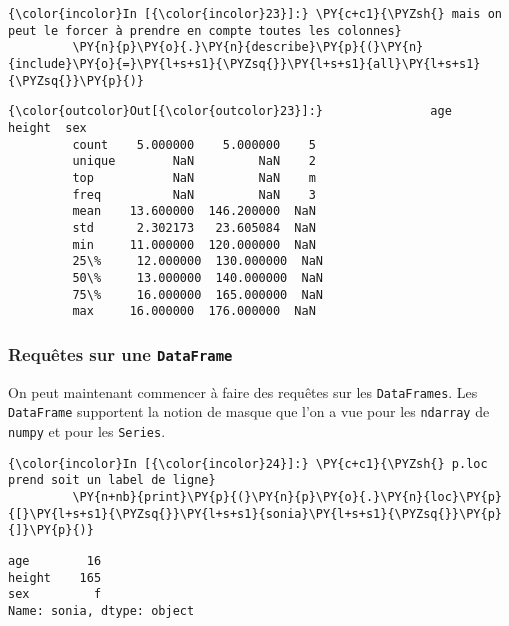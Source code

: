     \begin{Verbatim}[commandchars=\\\{\},frame=single,framerule=0.3mm,rulecolor=\color{cellframecolor}]
{\color{incolor}In [{\color{incolor}23}]:} \PY{c+c1}{\PYZsh{} mais on peut le forcer à prendre en compte toutes les colonnes}
         \PY{n}{p}\PY{o}{.}\PY{n}{describe}\PY{p}{(}\PY{n}{include}\PY{o}{=}\PY{l+s+s1}{\PYZsq{}}\PY{l+s+s1}{all}\PY{l+s+s1}{\PYZsq{}}\PY{p}{)}
\end{Verbatim}


\begin{Verbatim}[commandchars=\\\{\},frame=single,framerule=0.3mm,rulecolor=\color{cellframecolor}]
{\color{outcolor}Out[{\color{outcolor}23}]:}               age      height  sex
         count    5.000000    5.000000    5
         unique        NaN         NaN    2
         top           NaN         NaN    m
         freq          NaN         NaN    3
         mean    13.600000  146.200000  NaN
         std      2.302173   23.605084  NaN
         min     11.000000  120.000000  NaN
         25\%     12.000000  130.000000  NaN
         50\%     13.000000  140.000000  NaN
         75\%     16.000000  165.000000  NaN
         max     16.000000  176.000000  NaN
\end{Verbatim}
            
    \hypertarget{requuxeates-sur-une-dataframe}{%
\subsubsection{\texorpdfstring{Requêtes sur une
\texttt{DataFrame}}{Requêtes sur une DataFrame}}\label{requuxeates-sur-une-dataframe}}

    On peut maintenant commencer à faire des requêtes sur les
\texttt{DataFrames}. Les \texttt{DataFrame} supportent la notion de
masque que l'on a vue pour les \texttt{ndarray} de \texttt{numpy} et
pour les \texttt{Series}.

    \begin{Verbatim}[commandchars=\\\{\},frame=single,framerule=0.3mm,rulecolor=\color{cellframecolor}]
{\color{incolor}In [{\color{incolor}24}]:} \PY{c+c1}{\PYZsh{} p.loc prend soit un label de ligne}
         \PY{n+nb}{print}\PY{p}{(}\PY{n}{p}\PY{o}{.}\PY{n}{loc}\PY{p}{[}\PY{l+s+s1}{\PYZsq{}}\PY{l+s+s1}{sonia}\PY{l+s+s1}{\PYZsq{}}\PY{p}{]}\PY{p}{)}
\end{Verbatim}


    \begin{Verbatim}[commandchars=\\\{\},frame=single,framerule=0.3mm,rulecolor=\color{cellframecolor}]
age        16
height    165
sex         f
Name: sonia, dtype: object
\end{Verbatim}

